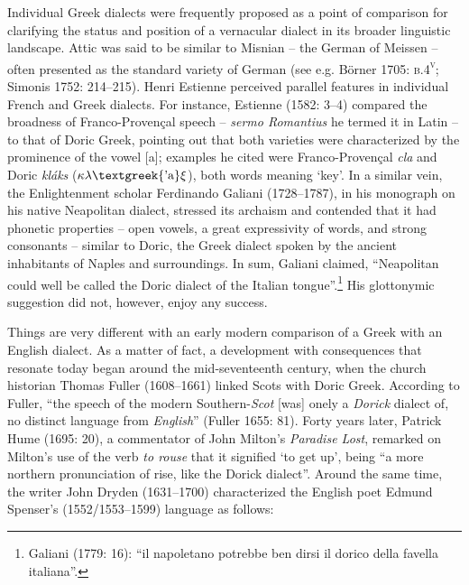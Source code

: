 \begin{styleStandard}
Individual Greek dialects were frequently proposed as a point of comparison for clarifying the status and position of a vernacular dialect in its broader linguistic landscape. Attic was said to be similar to Misnian – the German of Meissen – often presented as the standard variety of German (see e.g. Börner 1705: \textsc{b.4}\textsc{\textsuperscript{v}}; Simonis 1752: 214–215). Henri Estienne perceived parallel features in individual French and Greek dialects. For instance, Estienne (1582: 3–4) compared the broadness of Franco-Provençal speech – \textit{sermo Romantius} he termed it in Latin – to that of Doric Greek, pointing out that both varieties were characterized by the prominence of the vowel [a]; examples he cited were Franco-Provençal \textit{cla} and Doric \textit{kláks }($\kappa \lambda \text{\textgreek{'a}}\xi $), both words meaning ‘key’. In a similar vein, the Enlightenment scholar Ferdinando Galiani (1728–1787), in his monograph on his native Neapolitan dialect, stressed its archaism and contended that it had phonetic properties – open vowels, a great expressivity of words, and strong consonants – similar to Doric, the Greek dialect spoken by the ancient inhabitants of Naples and surroundings. In sum, Galiani claimed, “Neapolitan could well be called the Doric dialect of the Italian tongue”.\footnote{ Galiani (1779: 16): “il napoletano potrebbe ben dirsi il dorico della favella italiana”.} His glottonymic suggestion did not, however, enjoy any success.
\end{styleStandard}

\begin{styleStandard}
Things are very different with an early modern comparison of a Greek with an English dialect. As a matter of fact, a development with consequences that resonate today began around the mid-seventeenth century, when the church historian Thomas Fuller (1608–1661) linked Scots with Doric Greek. According to Fuller, “the speech of the modern Southern-\textit{Scot} [was] onely a \textit{Dorick} dialect of, no distinct language from \textit{English}” (Fuller 1655: 81). Forty years later, Patrick Hume (1695: 20), a commentator of John Milton’s \textit{Paradise Lost}, remarked on Milton’s use of the verb \textit{to rouse} that it signified ‘to get up’, being “a more northern pronunciation of rise, like the Dorick dialect”. Around the same time, the writer John Dryden (1631–1700) characterized the English poet Edmund Spenser’s (1552/1553–1599) language as follows:
\end{styleStandard}

